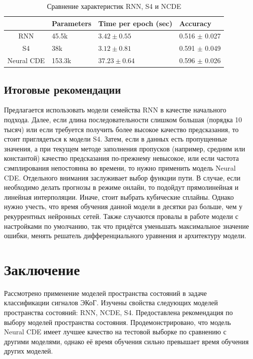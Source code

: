 \documentclass[a4paper, 12pt]{article}
\begin{document}
	\begin{table}[bhtp]
		\centering
		\caption{Сравнение характеристик RNN, S4 и NCDE}
		\label{tbl:rnn-s4-ncde}
		\begin{tabular}{c|l|l|l|}
			\cline{2-4}
			\multicolumn{1}{l|}{}  & Parameters & Time per epoch (sec) & Accuracy \\ \hline
			\multicolumn{1}{|c|}{RNN} & 45.5k & $3.42 \pm 0.55$ & 0.516 $\pm$ 0.027 \\ \hline
			\multicolumn{1}{|c|}{S4} & 38k & $3.12 \pm 0.81$ & 0.591 $\pm$ 0.049 \\ \hline
			\multicolumn{1}{|c|}{Neural CDE} & 153.3k & $37.23 \pm 0.64$ & 0.596 $\pm$ 0.026 \\ \hline
		\end{tabular}
	\end{table}
	
	\subsection{Итоговые рекомендации}
	Предлагается использовать модели семейства RNN в качестве начального подхода. Далее, если длина последовательности слишком большая (порядка 10 тысяч) или если требуется получить более высокое качество предсказания, то стоит приглядеться к модели S4. Затем, если в данных есть пропущенные значения, а при текущем методе заполнения пропусков (например, средним или константой) качество предсказания по-прежнему невысокое, или если частота сэмплирования непостоянна во времени, то нужно применить модель Neural CDE. Отдельного внимания заслуживает выбор функции пути. В случае, если необходимо делать прогнозы в режиме онлайн, то подойдут прямолинейная и линейная интерполяции. Иначе, стоит выбрать кубические сплайны. Однако нужно учесть, что время обучения данной модели в десятки раз больше, чем у рекуррентных нейронных сетей. Также случаются провалы в работе модели с настройками по умолчанию, так что придётся уменьшать максимальное значение ошибки, менять решатель дифференциального уравнения и архитектуру модели.
	
	\section{Заключение}
	Рассмотрено применение моделей пространства состояний в задаче классификации сигналов ЭКоГ.
	Изучены свойства следующих моделей пространства состояний: RNN, NCDE, S4.
	Предоставлена рекомендация по выбору моделей пространства состояния.
	Продемонстрировано, что модель Neural CDE имеет лучшее качество на тестовой выборке по сравнению с другими моделями, однако её время обучения сильно превышает время обучения других моделей.
	
	
	
	
\end{document}
